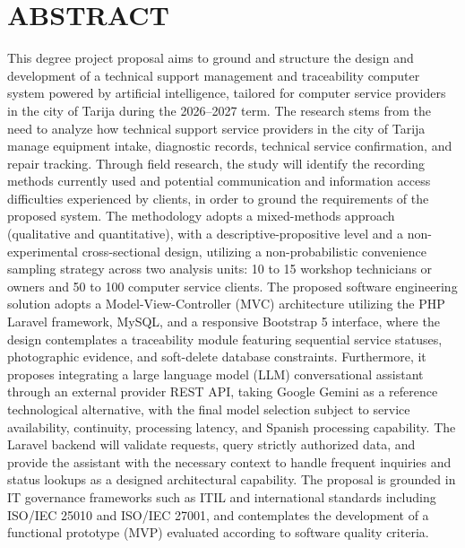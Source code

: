 \chapter*{ABSTRACT}

This degree project proposal aims to ground and structure the design and development of a technical support management and traceability computer system powered by artificial intelligence, tailored for computer service providers in the city of Tarija during the 2026--2027 term. The research stems from the need to analyze how technical support service providers in the city of Tarija manage equipment intake, diagnostic records, technical service confirmation, and repair tracking. Through field research, the study will identify the recording methods currently used and potential communication and information access difficulties experienced by clients, in order to ground the requirements of the proposed system. The methodology adopts a mixed-methods approach (qualitative and quantitative), with a descriptive-propositive level and a non-experimental cross-sectional design, utilizing a non-probabilistic convenience sampling strategy across two analysis units: 10 to 15 workshop technicians or owners and 50 to 100 computer service clients. The proposed software engineering solution adopts a Model-View-Controller (MVC) architecture utilizing the PHP Laravel framework, MySQL, and a responsive Bootstrap 5 interface, where the design contemplates a traceability module featuring sequential service statuses, photographic evidence, and soft-delete database constraints. Furthermore, it proposes integrating a large language model (LLM) conversational assistant through an external provider REST API, taking Google Gemini as a reference technological alternative, with the final model selection subject to service availability, continuity, processing latency, and Spanish processing capability. The Laravel backend will validate requests, query strictly authorized data, and provide the assistant with the necessary context to handle frequent inquiries and status lookups as a designed architectural capability. The proposal is grounded in IT governance frameworks such as ITIL and international standards including ISO/IEC 25010 and ISO/IEC 27001, and contemplates the development of a functional prototype (MVP) evaluated according to software quality criteria.